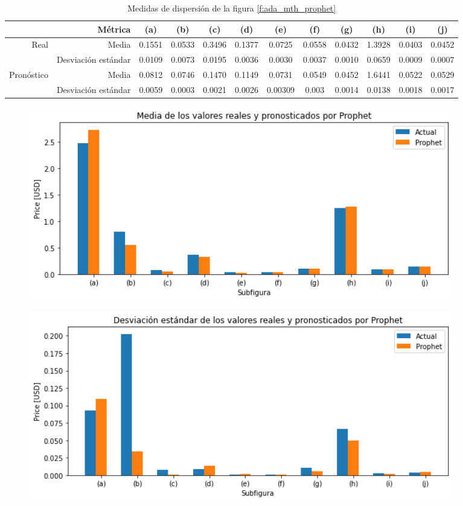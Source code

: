 \documentclass[a4paper,10pt]{article}
\begin{document}
\begin{table}[H]
 \begin{center}
 \resizebox{12cm}{!} {
  \begin{tabular}{|r|r|c|c|c|c|c|c|c|c|c|c|}
    & Métrica & (a) & (b) & (c) & (d) & (e) & (f) & (g) & (h) & (i) & (j) \\ \hline
    Real & Media & 0.1551 & 0.0533 & 0.3496 & 0.1377 & 0.0725 & 0.0558 & 0.0432 & 1.3928 & 0.0403 & 0.0452\\
    & Desviación estándar & 0.0109 & 0.0073 & 0.0195 & 0.0036 & 0.0030 & 0.0037 & 0.0010 & 0.0659 & 0.0009 & 0.0007\\
    Pronóstico & Media & 0.0812 & 0.0746 & 0.1470 & 0.1149 & 0.0731 & 0.0549 & 0.0452 & 1.6441 & 0.0522 & 0.0529\\
    & Desviación estándar & 0.0059 & 0.0003 & 0.0021 & 0.0026 & 0.00309 & 0.003 & 0.0014 & 0.0138 & 0.0018 & 0.0017\\ \hline
  \end{tabular}
  }
  \caption{Medidas de dispersión de la figura \ref{f:ada_mth_prophet}}
  \label{tab:ada_mh_avestd}
 \end{center}
\end{table}

\begin{figure}[H]
\centering
\includegraphics[width=0.9\textwidth]{./plots/prophet/ada/month/ave}
\label{f:ada_ave_mh}
\end{figure}


\begin{figure}[H]
\centering
\includegraphics[width=0.9\textwidth]{./plots/prophet/ada/month/std}
\label{f:ada_std_mh}
\end{figure}
\end{document}

